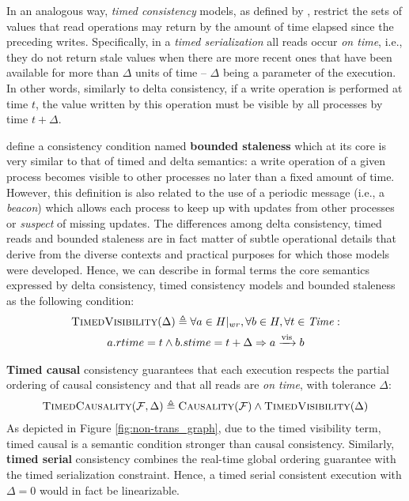 \documentclass[letter, 11pt]{article}
\newcommand{\citeN}{\citet}
\renewcommand{\cite}{\citep}
\begin{document}
In an analogous way, \emph{timed consistency} models, as defined by \citeN{Torres-Rojas.Ahamad.ea:99}, 
restrict the sets of values that read operations may return 
by the amount of time elapsed since the preceding writes.
Specifically, in a \emph{timed serialization} 
all reads occur \emph{on time}, i.e., they do not return stale values when 
there are more recent ones that have been available 
for more than $\Delta$ units of time -- $\Delta$ being a parameter of the execution.
In other words, similarly to delta consistency, if a write operation is performed at time $t$,
the value written by this operation must be visible by all processes by time $t + \Delta$. 

\citeN{Mahajan.Setty.ea:10} define a consistency condition named \textbf{bounded staleness} 
which at its core is very similar to that of timed and delta semantics: 
a write operation of a given process becomes visible to other processes no later than a fixed amount of time.
However, this definition is also related to the use of a periodic message (i.e., a \emph{beacon})
which allows each process to keep up with updates from other processes or \emph{suspect} of missing updates. 
The differences among delta consistency, timed reads and bounded staleness are in fact 
matter of subtle operational details that derive from the diverse contexts 
and practical purposes for which those models were developed.
Hence, we can describe in formal terms the core semantics expressed by delta consistency, timed consistency models and bounded staleness as the following condition:
\begin{multline}
\textsc{TimedVisibility}(\Delta) \triangleq  \forall a\in H|_{wr},\forall b \in H, \forall t \in \mathit{Time} : \\
a.rtime = t \wedge b.stime = t + \Delta \Rightarrow a \xrightarrow[]{\text{vis}} b
\end{multline}

\textbf{Timed causal} consistency \cite{Torres-Rojas.Meneses.05} 
guarantees that each execution respects the partial ordering of causal consistency 
and that all reads are \emph{on time}, with tolerance $\Delta$: 
\begin{align}
\textsc{TimedCausality}(\mathcal{F},\Delta) \triangleq 
\textsc{Causality}(\mathcal{F}) \wedge \textsc{TimedVisibility}(\Delta) \end{align}
As depicted in Figure \ref{fig:non-trans_graph}, due to the timed visibility term, timed causal is a semantic condition stronger than causal consistency. 
Similarly, \textbf{timed serial} consistency \cite{Torres-Rojas.Meneses.05} 
combines the real-time global ordering guarantee with the timed serialization constraint.
Hence, a timed serial consistent execution with $\Delta = 0$ would in fact be linearizable.
\end{document}
